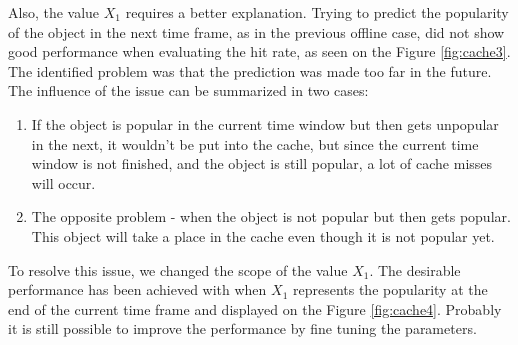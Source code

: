 Also, the value $X_1$ requires a better explanation. Trying to predict the popularity of the object in the next time frame, as in the previous offline case, did not show good performance when evaluating the hit rate, as seen on the Figure \ref{fig:cache3}. The identified problem was that the prediction was made too far in the future. The influence of the issue can be summarized in two cases:

\begin{enumerate}
	\item If the object is popular in the current time window but then gets unpopular in the next, it wouldn't be put into the cache, but since the current time window is not finished, and the object is still popular, a lot of cache misses will occur.
	\item The opposite problem - when the object is not popular but then gets popular. This object will take a place in the cache even though it is not popular yet.
\end{enumerate}

To resolve this issue, we changed the scope of the value $X_1$. The desirable performance has been achieved with when $X_1$ represents the popularity at the end of the current time frame and displayed on the Figure \ref{fig:cache4}. Probably it is still possible to improve the performance by fine tuning the parameters. 

